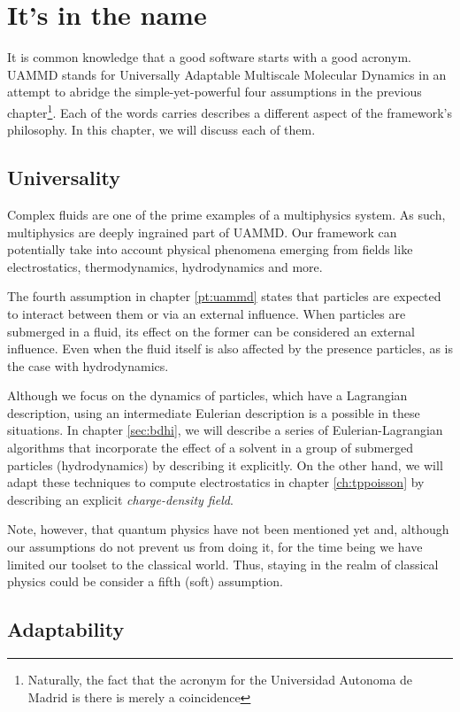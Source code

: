 \documentclass[ twoside,openright,titlepage,numbers=noenddot,%
headinclude,footinclude,cleardoublepage=empty,abstract=on,
BCOR=5mm,paper=a4,fontsize=11pt, dvipsnames
]{scrreprt}
\newcommand{\uammd}{\gls{UAMMD}\xspace}
\begin{document}
\chapter{It's in the name}\label{ch:design}

It is common knowledge that a good software starts with a good acronym. \uammd stands for Universally Adaptable Multiscale Molecular Dynamics in an attempt to abridge the simple-yet-powerful four assumptions in the previous chapter\footnote{Naturally, the fact that the acronym for the Universidad Autonoma de Madrid is there is merely a coincidence}. Each of the words carries describes a different aspect of the framework's philosophy. In this chapter, we will discuss each of them.
\section{Universality}

Complex fluids are one of the prime examples of a multiphysics system. As such, multiphysics are deeply ingrained part of \uammd. Our framework can potentially take into account physical phenomena emerging from fields like electrostatics, thermodynamics, hydrodynamics and more.
  
The fourth assumption in chapter \ref{pt:uammd} states that particles are expected to interact between them or via an external influence. When particles are submerged in a fluid, its effect on the former can be considered an external influence. Even when the fluid itself is also affected by the presence particles, as is the case with hydrodynamics.
  
Although we focus on the dynamics of particles, which have a Lagrangian description, using an intermediate Eulerian description is a possible in these situations. In chapter \ref{sec:bdhi}, we will describe a series of Eulerian-Lagrangian algorithms that incorporate the effect of a solvent in a group of submerged particles (hydrodynamics) by describing it explicitly. On the other hand, we will adapt these techniques to compute electrostatics in chapter \ref{ch:tppoisson} by describing an explicit \emph{charge-density field}.

Note, however, that quantum physics have not been mentioned yet and, although our assumptions do not prevent us from doing it, for the time being we have limited our toolset to the classical world. Thus, staying in the realm of classical physics could be consider a fifth (soft) assumption.

\section{Adaptability}
\end{document}
